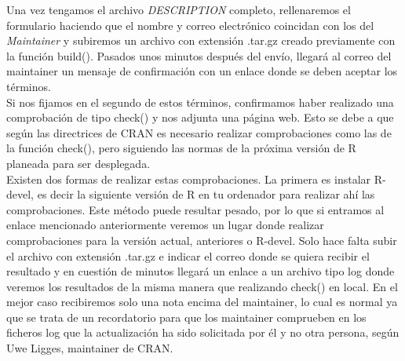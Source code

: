 Una vez tengamos el archivo \textit{DESCRIPTION} completo, rellenaremos el formulario haciendo que el nombre y correo electrónico coincidan con los del \textit{Maintainer} y subiremos un archivo con extensión .tar.gz creado previamente con la función build(). Pasados unos minutos después del envío, llegará al correo del maintainer un mensaje de confirmación con un enlace donde se deben aceptar los términos.\\

Si nos fijamos en el segundo de estos términos, confirmamos haber realizado una comprobación de tipo check() y nos adjunta una página web. Esto se debe a que según las directrices de CRAN es necesario realizar comprobaciones como las de la función check(), pero siguiendo las normas de la próxima versión de R planeada para ser desplegada.\\

Existen dos formas de realizar estas comprobaciones. La primera es instalar R-devel, es decir la siguiente versión de R en tu ordenador para realizar ahí las comprobaciones. Este método puede resultar pesado, por lo que si entramos al enlace mencionado anteriormente veremos un lugar donde realizar comprobaciones para la versión actual, anteriores o R-devel. Solo hace falta subir el archivo con extensión .tar.gz e indicar el correo donde se quiera recibir el resultado y en cuestión de minutos llegará un enlace a un archivo tipo log donde veremos los resultados de la misma manera que realizando check() en local. En el mejor caso recibiremos solo una nota encima del maintainer, lo cual es normal ya que se trata de un recordatorio para que los maintainer comprueben en los ficheros log que la actualización ha sido solicitada por él y no otra persona, según Uwe Ligges, maintainer de CRAN.\\



